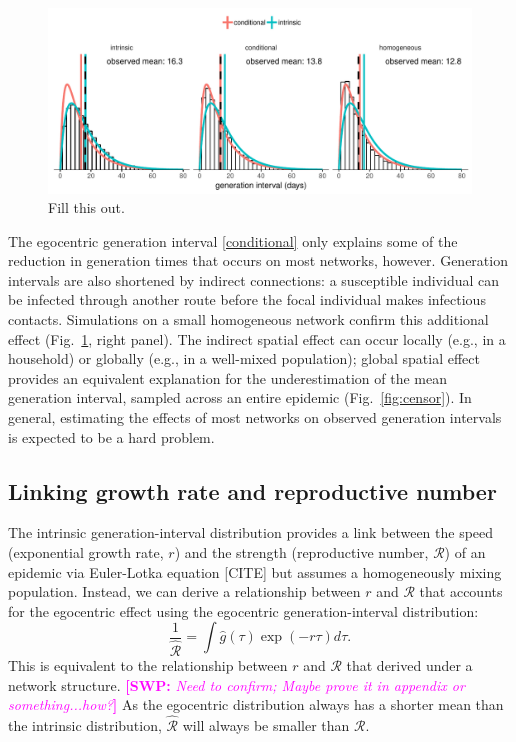 \documentclass[12pt]{article}
\newcommand{\fref}[1]{Fig.~\ref{fig:#1}}
\newcommand{\RR}{\ensuremath{{\mathcal R}}}
\newcommand{\comment}[3]{\textcolor{#1}{\textbf{[#2: }\textsl{#3}\textbf{]}}}
\newcommand{\swp}[1]{\comment{magenta}{SWP}{#1}}
\begin{document}
\begin{figure}
\includegraphics[width=\textwidth]{../fig/local_effect.pdf}
\caption{Fill this out.}
\label{fig:local}
\end{figure}

The egocentric generation interval \eqref{conditional} only explains some of the reduction in generation times that occurs on most networks, however.
Generation intervals are also shortened by indirect connections: a susceptible individual can be infected through another route before the focal individual makes infectious contacts.
Simulations on a small homogeneous network confirm this additional effect (\fref{local}, right panel). 
The indirect spatial effect can occur locally (e.g., in a household) or globally (e.g., in a well-mixed population); global spatial effect provides an equivalent explanation for the underestimation of the mean generation interval, sampled across an entire epidemic (\fref{censor}). 
In general, estimating the effects of most networks on observed generation intervals is expected to be a hard problem. 

\subsection{Linking growth rate and reproductive number}

The intrinsic generation-interval distribution provides a link between the speed (exponential growth rate, $r$) and the strength (reproductive number, $\RR$) of an epidemic via Euler-Lotka equation [CITE] but assumes a homogeneously mixing population.
Instead, we can derive a relationship between $r$ and $\RR$ that accounts for the egocentric effect using the egocentric generation-interval distribution:
\begin{equation}
\frac{1}{\hat{\RR}} = \int \hat{g}(\tau) \exp(-r \tau) d\tau.
\end{equation}
This is equivalent to the relationship between $r$ and $\RR$ that \cite{trapman2016inferring} derived under a network structure. \swp{Need to confirm; Maybe prove it in appendix or something...how?}
As the egocentric distribution always has a shorter mean than the intrinsic distribution, $\hat{\RR}$ will always be smaller than $\RR$.
\end{document}

